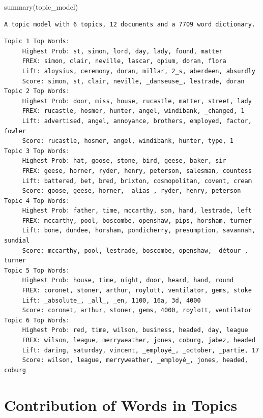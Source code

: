 \documentclass[
  letterpaper,
  DIV=11,
  numbers=noendperiod]{scrreprt}
\newenvironment{Shaded}{\begin{snugshade}}{\end{snugshade}}
\newcommand{\FunctionTok}[1]{\textcolor[rgb]{0.28,0.35,0.67}{#1}}
\newcommand{\NormalTok}[1]{\textcolor[rgb]{0.00,0.23,0.31}{#1}}
\begin{document}
\begin{Shaded}
\begin{Highlighting}[]
\FunctionTok{summary}\NormalTok{(topic\_model)}
\end{Highlighting}
\end{Shaded}

\begin{verbatim}
A topic model with 6 topics, 12 documents and a 7709 word dictionary.
\end{verbatim}

\begin{verbatim}
Topic 1 Top Words:
     Highest Prob: st, simon, lord, day, lady, found, matter 
     FREX: simon, clair, neville, lascar, opium, doran, flora 
     Lift: aloysius, ceremony, doran, millar, 2_s, aberdeen, absurdly 
     Score: simon, st, clair, neville, _danseuse_, lestrade, doran 
Topic 2 Top Words:
     Highest Prob: door, miss, house, rucastle, matter, street, lady 
     FREX: rucastle, hosmer, hunter, angel, windibank, _changed, 1 
     Lift: advertised, angel, annoyance, brothers, employed, factor, fowler 
     Score: rucastle, hosmer, angel, windibank, hunter, type, 1 
Topic 3 Top Words:
     Highest Prob: hat, goose, stone, bird, geese, baker, sir 
     FREX: geese, horner, ryder, henry, peterson, salesman, countess 
     Lift: battered, bet, bred, brixton, cosmopolitan, covent, cream 
     Score: goose, geese, horner, _alias_, ryder, henry, peterson 
Topic 4 Top Words:
     Highest Prob: father, time, mccarthy, son, hand, lestrade, left 
     FREX: mccarthy, pool, boscombe, openshaw, pips, horsham, turner 
     Lift: bone, dundee, horsham, pondicherry, presumption, savannah, sundial 
     Score: mccarthy, pool, lestrade, boscombe, openshaw, _détour_, turner 
Topic 5 Top Words:
     Highest Prob: house, time, night, door, heard, hand, round 
     FREX: coronet, stoner, arthur, roylott, ventilator, gems, stoke 
     Lift: _absolute_, _all_, _en, 1100, 16a, 3d, 4000 
     Score: coronet, arthur, stoner, gems, 4000, roylott, ventilator 
Topic 6 Top Words:
     Highest Prob: red, time, wilson, business, headed, day, league 
     FREX: wilson, league, merryweather, jones, coburg, jabez, headed 
     Lift: daring, saturday, vincent, _employé_, _october, _partie, 17 
     Score: wilson, league, merryweather, _employé_, jones, headed, coburg 
\end{verbatim}

\section{Contribution of Words in
Topics}\label{contribution-of-words-in-topics}
\end{document}
